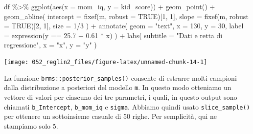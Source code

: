 \documentclass[
  10pt,
  italian,
  a4paper,
  extrafontsizes,onecolumn,openright
  ]{memoir}
\newenvironment{Shaded}{\begin{snugshade}}{\end{snugshade}}
\newcommand{\AttributeTok}[1]{\textcolor[rgb]{0.77,0.63,0.00}{#1}}
\newcommand{\ConstantTok}[1]{\textcolor[rgb]{0.00,0.00,0.00}{#1}}
\newcommand{\DecValTok}[1]{\textcolor[rgb]{0.00,0.00,0.81}{#1}}
\newcommand{\FloatTok}[1]{\textcolor[rgb]{0.00,0.00,0.81}{#1}}
\newcommand{\FunctionTok}[1]{\textcolor[rgb]{0.00,0.00,0.00}{#1}}
\newcommand{\NormalTok}[1]{#1}
\newcommand{\SpecialCharTok}[1]{\textcolor[rgb]{0.00,0.00,0.00}{#1}}
\newcommand{\StringTok}[1]{\textcolor[rgb]{0.31,0.60,0.02}{#1}}
\begin{document}
\begin{Shaded}
\begin{Highlighting}[]
\NormalTok{df }\SpecialCharTok{\%\textgreater{}\%} 
  \FunctionTok{ggplot}\NormalTok{(}\FunctionTok{aes}\NormalTok{(}\AttributeTok{x =}\NormalTok{ mom\_iq, }\AttributeTok{y =}\NormalTok{ kid\_score)) }\SpecialCharTok{+}
  \FunctionTok{geom\_point}\NormalTok{() }\SpecialCharTok{+}
  \FunctionTok{geom\_abline}\NormalTok{(}
    \AttributeTok{intercept =} \FunctionTok{fixef}\NormalTok{(m, }\AttributeTok{robust =} \ConstantTok{TRUE}\NormalTok{)[}\DecValTok{1}\NormalTok{, }\DecValTok{1}\NormalTok{], }
    \AttributeTok{slope =} \FunctionTok{fixef}\NormalTok{(m, }\AttributeTok{robust =} \ConstantTok{TRUE}\NormalTok{)[}\DecValTok{2}\NormalTok{, }\DecValTok{1}\NormalTok{],}
    \AttributeTok{size =} \DecValTok{1}\SpecialCharTok{/}\DecValTok{3}
\NormalTok{  ) }\SpecialCharTok{+}
  \FunctionTok{annotate}\NormalTok{(}
    \AttributeTok{geom =} \StringTok{"text"}\NormalTok{,}
    \AttributeTok{x =} \DecValTok{130}\NormalTok{, }\AttributeTok{y =} \DecValTok{30}\NormalTok{,}
    \AttributeTok{label =} \FunctionTok{expression}\NormalTok{(y }\SpecialCharTok{==} \FloatTok{25.7} \SpecialCharTok{+} \FloatTok{0.61} \SpecialCharTok{*}\NormalTok{ x)}
\NormalTok{  ) }\SpecialCharTok{+}
  \FunctionTok{labs}\NormalTok{(}
    \AttributeTok{subtitle =} \StringTok{"Dati e retta di regressione"}\NormalTok{,}
    \AttributeTok{x =} \StringTok{"x"}\NormalTok{,}
    \AttributeTok{y =} \StringTok{"y"}
\NormalTok{  ) }
\end{Highlighting}
\end{Shaded}

\begin{center}\texttt{[image: 052\_reglin2\_files/figure-latex/unnamed-chunk-14-1]} \end{center}

La funzione \texttt{brms::posterior\_samples()} consente di estrarre molti campioni dalla distribuzione a posteriori del modello \texttt{m}. In questo modo otteniamo un vettore di valori per ciascuno dei tre parametri, i quali, in questo output sono chiamati \texttt{b\_Intercept}, \texttt{b\_mom\_iq} e \texttt{sigma}. Abbiamo quindi usato \texttt{slice\_sample()} per ottenere un sottoinsieme casuale di 50 righe. Per semplicità, qui ne stampiamo solo 5.
\end{document}
